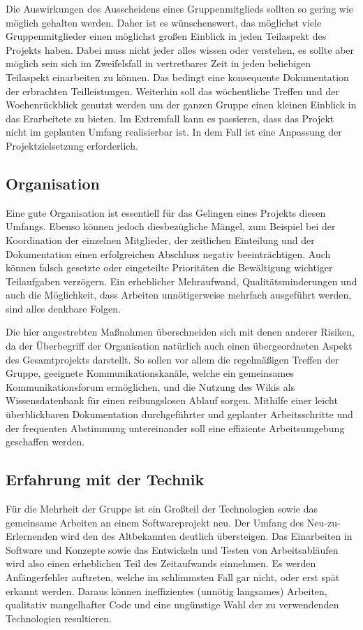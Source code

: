 \massnamen
  Die Auswirkungen des Ausscheidens eines Gruppenmitglieds sollten so gering wie möglich gehalten werden.
  Daher ist es wünschenswert, das möglichst viele Gruppenmitglieder einen möglichst großen Einblick in jeden Teilaspekt des Projekts haben. Dabei muss nicht jeder alles wissen oder verstehen, es sollte aber möglich sein sich im Zweifelsfall in vertretbarer Zeit in jeden beliebigen Teilaspekt einarbeiten zu können.
  Das bedingt eine konsequente Dokumentation der erbrachten Teilleistungen.
  Weiterhin soll das wöchentliche Treffen und der Wochenrückblick genutzt werden um der ganzen Gruppe einen kleinen Einblick in das Erarbeitete zu bieten.
  Im Extremfall kann es passieren, dass das Projekt nicht im geplanten Umfang realisierbar ist. In dem Fall ist eine Anpassung der Projektzielsetzung erforderlich.


\subsection{Organisation}\label{r6}
  Eine gute Organisation ist essentiell für das Gelingen eines Projekts diesen Umfangs. Ebenso können jedoch diesbezügliche Mängel, zum Beispiel bei der Koordination der einzelnen Mitglieder, der zeitlichen Einteilung und der Dokumentation einen erfolgreichen Abschluss negativ beeinträchtigen. Auch können falsch gesetzte oder eingeteilte Prioritäten die Bewältigung wichtiger Teilaufgaben verzögern. Ein erheblicher Mehraufwand, Qualitätsminderungen und auch die Möglichkeit, dass Arbeiten unnötigerweise mehrfach ausgeführt werden, sind alles denkbare Folgen. 

\massnamen
\bgroup
{}
  Die hier angestrebten Maßnahmen überschneiden sich mit denen anderer Risiken, da der Überbegriff der Organisation natürlich auch einen übergeordneten Aspekt des Gesamtprojekts darstellt. So sollen vor allem die regelmäßigen Treffen der Gruppe, geeignete Kom\-mu\-ni\-ka\-tions\-ka\-nä\-le, welche ein gemeinsames Kommunikationsforum ermöglichen, und die Nutzung des Wikis als Wissensdatenbank für einen reibungslosen Ablauf sorgen. Mithilfe einer leicht überblickbaren Dokumentation durchgeführter und geplanter Arbeitsschritte und der frequenten Abstimmung untereinander soll eine effiziente Arbeitsumgebung geschaffen werden.
\egroup


\subsection{Erfahrung mit der Technik}\label{r7}
  Für die Mehrheit der Gruppe ist ein Großteil der Technologien sowie das gemeinsame Arbeiten an einem Softwareprojekt neu. Der Umfang des {\glqq}Neu-zu-Erlernenden{\grqq} wird den des {\glqq}Altbekannten{\grqq} deutlich übersteigen.
  Das Einarbeiten in Software und Konzepte sowie das Entwickeln und Testen von Arbeitsabläufen wird also einen erheblichen Teil des Zeitaufwands einnehmen.
  Es werden Anfängerfehler auftreten, welche im schlimmsten Fall gar nicht, oder erst spät erkannt werden.
  Daraus können ineffizientes (unnötig langsames) Arbeiten, qualitativ mangelhafter Code und eine ungünstige Wahl der zu verwendenden Technologien resultieren.
  

